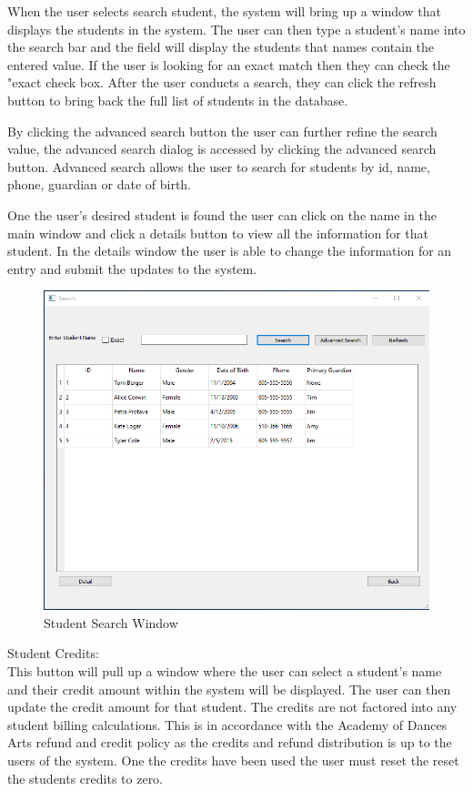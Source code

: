 When the user selects search student, the system will bring up a window that displays the students in the system. The user can then type a student's name into the search bar and the field will display the students that names contain the entered value. If the user is looking for an exact match then they can check the "exact check box. After the user conducts a search, they can click the refresh button to bring back the full list of students in the database.

By clicking the advanced search button the user can further refine the search value, the advanced search dialog is accessed by clicking the advanced search button. Advanced search allows the user to search for students by id, name, phone, guardian or date of birth.

One the user's desired student is found the user can click on the name in the main window and click a details button to view all the information for that student.  In the details window the user is able to change the information for an entry and submit the updates to the system.\\

\begin{figure}
  \includegraphics[width=\linewidth]{pics/userGuide/searchStudents.png}
  \caption{Student Search Window}
  \label{fig:User doc: Student Search}
\end{figure}


Student Credits:\\
This button will pull up a window where the user can select a student's name and their credit amount within the system will be displayed. The user can then update the credit amount for that student. The credits are not factored into any student billing calculations. This is in accordance with the Academy of Dances Arts refund and credit policy as the credits and refund distribution is up to the users of the system. One the credits have been used the user must reset the reset the students credits to zero.\\

